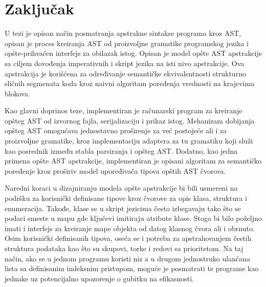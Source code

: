 \chapter{Zaključak}
\label{chp:conclusion}

U tezi je opisan način posmatranja apstrakne sintakse programa kroz AST, opisan je proces kreiranja AST od proizvoljne gramatike programskog jezika i opšte-prihvaćen interfejs za obilazak istog. Opisan je model opšte AST apstrakcije sa ciljem dovođenja imperativnih i skript jezika na isti nivo apstrakcije. Ova apstrakcija je korišćena za određivanje semantičke ekvivalentnosti strukturno sličnih segmenata koda kroz naivni algoritam poređenja vrednosti na krajevima blokova.

Kao glavni doprinos teze, implementiran je računarski program za kreiranje opšteg AST od izvornog fajla, serijalizaciju i prikaz istog. Mehanizam dobijanja opšteg AST omogućava jednostavno proširenje za već postojeće ali i za proizvoljne gramatike, kroz implementaciju adaptera za tu gramatiku koji služi kao posrednik između stabla parsiranja i opšteg AST. Dodatno, kao jedna primena opšte AST apstrakcije, implementiran je opisani algoritam za semantičko poređenje kroz proširiv model upoređivača tipova opštih AST čvorova.

Naredni koraci u dizajniranju modela opšte apstrakcije bi bili usmereni na podršku za korisnički definisane tipove kroz čvorove za opis klasa, struktura i enumeracija. Takođe, klase se u skript jezicima često izbegavaju tako što se podaci smeste u mapu gde ključevi imitiraju atribute klase. Stoga bi bilo poželjno imati i interfejs za kreiranje mape objekta od datog klasnog čvora ali i obrnuto. Osim korisnički definisanih tipova, oseća se i potreba za apstrahovanjem čestih struktura podataka kao što su skupovi, torke i redovi sa prioritetom. Na taj način, ako se u jednom programu koristi niz a u drugom jednostruko ulančana lista sa definisanim indeksnim pristupom, moguće je posmatrati te programe kao jednake uz potencijalno upozorenje o gubitku na efikasnosti. 